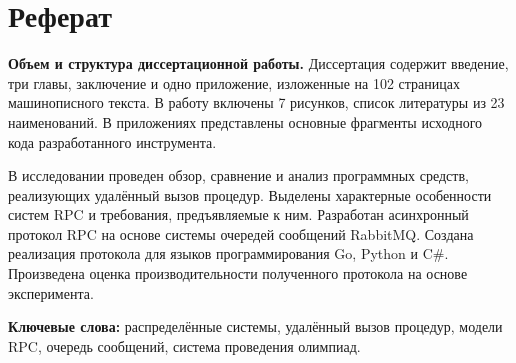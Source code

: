 \chapter*{Реферат}
\textbf{Объем и структура диссертационной работы.}
Диссертация содержит введение, три главы, заключение и одно приложение,
изложенные на 102 страницах машинописного текста.
В работу включены 7 рисунков, список литературы из 23 наименований.
В приложениях представлены основные фрагменты исходного кода
разработанного инструмента.

В исследовании проведен обзор, сравнение и анализ программных средств,
реализующих удалённый вызов процедур.
Выделены характерные особенности систем RPC и требования, предъявляемые к ним.
Разработан асинхронный протокол RPC на основе системы очередей сообщений
RabbitMQ. Создана реализация протокола для языков программирования Go, Python
и C\#. Произведена оценка производительности полученного протокола на основе
эксперимента.

\textbf{Ключевые слова:}
распределённые системы,
удалённый вызов процедур,
модели RPC,
очередь сообщений,
система проведения олимпиад.

